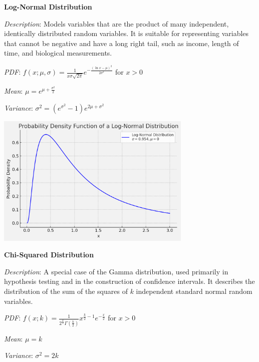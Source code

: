 \documentclass{article}
\begin{document}
\begin{multicols}{2}
\begin{mdframed}
\end{mdframed}
\begin{mdframed}
    \textbf{Log-Normal Distribution}
    
    \textit{Description}: Models variables that are the product of many independent, identically distributed random variables. It is suitable for representing variables that cannot be negative and have a long right tail, such as income, length of time, and biological measurements.
    
    \textit{PDF}: $f(x; \mu, \sigma) = \frac{1}{x\sigma\sqrt{2\pi}} e^{-\frac{(\ln x-\mu)^2}{2\sigma^2}}$ for $x > 0$
    
    \textit{Mean}: $\mu = e^{\mu + \frac{\sigma^2}{2}}$
    
    \textit{Variance}: $\sigma^2 = (e^{\sigma^2} - 1)e^{2\mu + \sigma^2}$
    
    \begin{center}
      \includegraphics*[width=0.7\textwidth]{lognormal.png}
    \end{center}
    
\end{mdframed}
\begin{mdframed}
      \textbf{Chi-Squared Distribution}
      
      \textit{Description}: A special case of the Gamma distribution, used primarily in hypothesis testing and in the construction of confidence intervals. It describes the distribution of the sum of the squares of $k$ independent standard normal random variables.
      
      \textit{PDF}: $f(x; k) = \frac{1}{2^{\frac{k}{2}}\Gamma(\frac{k}{2})}x^{\frac{k}{2}-1}e^{-\frac{x}{2}}$ for $x > 0$
      
      \textit{Mean}: $\mu = k$
      
      \textit{Variance}: $\sigma^2 = 2k$
      

\end{mdframed}
\end{multicols}
\end{document}

